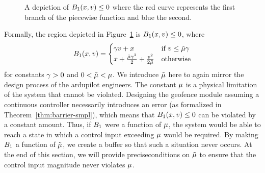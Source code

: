 \begin{figure}
\centering
{}
\caption{A depiction of $B_1 (x,v) \leq 0$ where the red curve represents the first branch of the piecewise function and blue the second.}
\label{fig:sqrt-lin}
\end{figure}

Formally, the region depicted in Figure~\ref{fig:sqrt-lin} is $B_1 (x,v)
\leq 0$, where
\begin{equation}
B_1 (x,v) =
\begin{cases}
\gamma v + x & \text{if } v \leq \tilde{\mu}\gamma \\
x + \frac{\tilde{\mu} \gamma^2}{2} + \frac{v^2}{2\tilde{\mu}} & \text{otherwise}
\end{cases}
\label{eq:barrier-piecewise-dbl-int}
\end{equation}
for constants $\gamma > 0$ and $0 < \tilde{\mu} < \mu$. We introduce $\tilde{\mu}$ here
to again mirror the design process of the ardupilot engineers. The constant
$\mu$ is a physical limitation of the system that cannot be
violated. Designing the geofence module assuming a continuous controller
necessarily introduces an error (as formalized in
Theorem~\ref{thm:barrier-smpl}), which means that $B_1 (x,v) \leq 0$ can
be violated by a constant amount. Thus, if $B_1$ were a function of
$\mu$, the system would be able to reach a state in which a control input
exceeding $\mu$ would be required. By making $B_1$ a function of
$\tilde{\mu}$, we create a buffer so that such a situation never occurs. At the
end of this section, we will provide preciseconditions on $\tilde{\mu}$ to
ensure that the control input magnitude never violates $\mu$.

